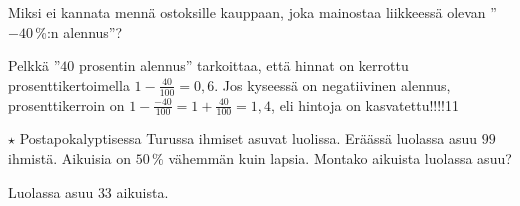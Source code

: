 \begin{tehtavasivu}
\begin{tehtava}
Miksi ei kannata mennä ostoksille kauppaan, joka mainostaa liikkeessä olevan ''$-40$\,\%:n alennus''?
	\begin{vastaus}
	Pelkkä ''$40$ prosentin alennus'' tarkoittaa, että hinnat on kerrottu prosenttikertoimella $1-\frac{40}{100}=0,6$. Jos kyseessä on negatiivinen alennus, prosenttikerroin on $1-\frac{-40}{100}=1+\frac{40}{100}=1,4$, eli hintoja on kasvatettu!!!!11
	\end{vastaus}
\end{tehtava}

\begin{tehtava} 
		$\star$ Postapokalyptisessa Turussa ihmiset asuvat luolissa. Eräässä luolassa asuu $99$ ihmistä. Aikuisia on $50\,\%$ vähemmän kuin lapsia. Montako aikuista luolassa asuu?
	\begin{vastaus}
	Luolassa asuu $33$ aikuista.
	\end{vastaus}
\end{tehtava} %

\end{tehtavasivu}